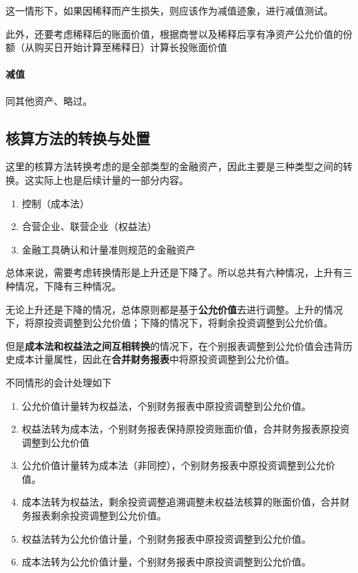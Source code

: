\documentclass[UTF8,12pt]{ctexart}
\numberwithin{equation}{section} %
\numberwithin{figure}{section}
\numberwithin{table}{section}
\begin{document}
	这一情形下，如果因稀释而产生损失，则应该作为减值迹象，进行减值测试。
	
	此外，还要考虑稀释后的账面价值，根据商誉以及稀释后享有净资产公允价值的份额（从购买日开始计算至稀释日）计算长投账面价值
	
	\paragraph{减值}
	同其他资产、略过。
	
	\subsection{核算方法的转换与处置}
	这里的核算方法转换考虑的是全部类型的金融资产，因此主要是三种类型之间的转换。这实际上也是后续计量的一部分内容。
	\begin{enumerate}
		\item 控制（成本法）
		
		\item 合营企业、联营企业（权益法）
		
		\item 金融工具确认和计量准则规范的金融资产
	\end{enumerate}
	
	总体来说，需要考虑转换情形是上升还是下降了。所以总共有六种情况，上升有三种情况，下降有三种情况。
	
	无论上升还是下降的情况，总体原则都是基于\textbf{公允价值}去进行调整。上升的情况下，将原投资调整到公允价值；下降的情况下，将剩余投资调整到公允价值。
	
	但是\textbf{成本法和权益法之间互相转换}的情况下，在个别报表调整到公允价值会违背历史成本计量属性，因此在\textbf{合并财务报表}中将原投资调整到公允价值。
	
	不同情形的会计处理如下
	\begin{enumerate}
		\item 公允价值计量转为权益法，个别财务报表中原投资调整到公允价值。
		
		\item 权益法转为成本法，个别财务报表保持原投资账面价值，合并财务报表原投资调整到公允价值
		
		\item 公允价值计量转为成本法（非同控），个别财务报表中原投资调整到公允价值。
		
		\item 成本法转为权益法，剩余投资调整追溯调整未权益法核算的账面价值，合并财务报表剩余投资调整到公允价值。
		
		\item 权益法转为公允价值计量，个别财务报表中原投资调整到公允价值。
		
		\item 成本法转为公允价值计量，个别财务报表中原投资调整到公允价值。
	\end{enumerate}
	
\end{document}
